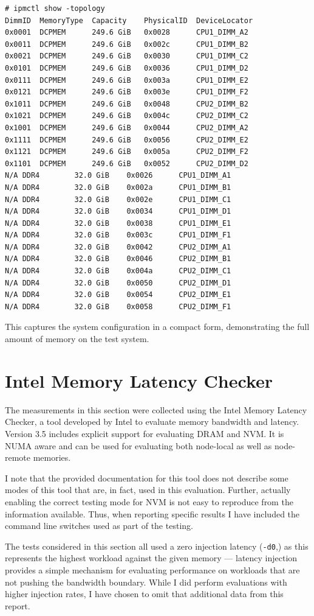 \begin{verbatim}
# ipmctl show -topology
DimmID	MemoryType	Capacity	PhysicalID	DeviceLocator
0x0001	DCPMEM		249.6 GiB	0x0028		CPU1_DIMM_A2
0x0011	DCPMEM		249.6 GiB	0x002c		CPU1_DIMM_B2
0x0021	DCPMEM		249.6 GiB	0x0030		CPU1_DIMM_C2
0x0101	DCPMEM		249.6 GiB	0x0036		CPU1_DIMM_D2
0x0111	DCPMEM		249.6 GiB	0x003a		CPU1_DIMM_E2
0x0121	DCPMEM		249.6 GiB	0x003e		CPU1_DIMM_F2
0x1011	DCPMEM		249.6 GiB	0x0048		CPU2_DIMM_B2
0x1021	DCPMEM		249.6 GiB	0x004c		CPU2_DIMM_C2
0x1001	DCPMEM		249.6 GiB	0x0044		CPU2_DIMM_A2
0x1111	DCPMEM		249.6 GiB	0x0056		CPU2_DIMM_E2
0x1121	DCPMEM		249.6 GiB	0x005a		CPU2_DIMM_F2
0x1101	DCPMEM		249.6 GiB	0x0052		CPU2_DIMM_D2
N/A	DDR4		32.0 GiB	0x0026		CPU1_DIMM_A1
N/A	DDR4		32.0 GiB	0x002a		CPU1_DIMM_B1
N/A	DDR4		32.0 GiB	0x002e		CPU1_DIMM_C1
N/A	DDR4		32.0 GiB	0x0034		CPU1_DIMM_D1
N/A	DDR4		32.0 GiB	0x0038		CPU1_DIMM_E1
N/A	DDR4		32.0 GiB	0x003c		CPU1_DIMM_F1
N/A	DDR4		32.0 GiB	0x0042		CPU2_DIMM_A1
N/A	DDR4		32.0 GiB	0x0046		CPU2_DIMM_B1
N/A	DDR4		32.0 GiB	0x004a		CPU2_DIMM_C1
N/A	DDR4		32.0 GiB	0x0050		CPU2_DIMM_D1
N/A	DDR4		32.0 GiB	0x0054		CPU2_DIMM_E1
N/A	DDR4		32.0 GiB	0x0058		CPU2_DIMM_F1
\end{verbatim}

This captures the system configuration in a compact form, demonstrating the full amount of memory on
the test system.


\section{Intel Memory Latency Checker}\label{section:results:mlc}

The measurements in this section were collected using the Intel Memory Latency Checker, a tool
developed by Intel to evaluate memory bandwidth and latency.  Version 3.5 includes explicit
support for evaluating DRAM and NVM.  It is NUMA aware and can be used for evaluating both
node-local as well as node-remote memories.~\cite{IntelMLC35}

I note that the provided documentation for this tool does not describe some modes of
this tool that are, in fact, used in this evaluation.  Further, actually enabling the
correct testing mode for NVM is not easy to reproduce from the information available.
Thus, when reporting specific results I have included the command line switches used
as part of the testing. 

The tests considered in this section all used a zero injection latency (\texttt{-d0},)
as this represents the highest workload against the given memory --- latency injection
provides a simple mechanism for evaluating performance on workloads that are not
pushing the bandwidth boundary.  While I did perform evaluations with higher
injection rates, I have chosen to omit that additional data from this report.

